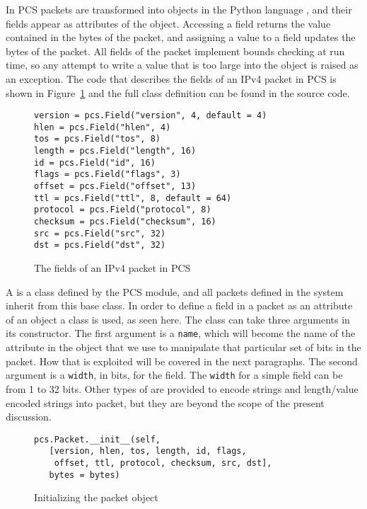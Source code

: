 \documentclass{sig-alternate-10pt}
\begin{document}
In PCS packets are transformed into objects in the Python language
\cite{vanRossum}, and their fields appear as attributes of the object.
Accessing a field returns the value contained in the bytes of the
packet, and assigning a value to a field updates the bytes of the
packet.  All fields of the packet implement bounds checking at run
time, so any attempt to write a value that is too large into the
object is raised as an exception.  The code that describes the fields
of an IPv4 packet in PCS is shown in
Figure~\ref{fig:ipv4-packet-in-pcs} and the full class definition can
be found in the source code\cite{}.

\begin{figure}
  \centering
\begin{verbatim}
version = pcs.Field("version", 4, default = 4)
hlen = pcs.Field("hlen", 4)
tos = pcs.Field("tos", 8)
length = pcs.Field("length", 16)
id = pcs.Field("id", 16)
flags = pcs.Field("flags", 3)
offset = pcs.Field("offset", 13)
ttl = pcs.Field("ttl", 8, default = 64)
protocol = pcs.Field("protocol", 8)
checksum = pcs.Field("checksum", 16)
src = pcs.Field("src", 32)
dst = pcs.Field("dst", 32)
\end{verbatim}
  \caption{The fields of an IPv4 packet in PCS}
  \label{fig:ipv4-packet-in-pcs}
\end{figure}

A  is a class defined by the PCS module, and all packets
defined in the system inherit from this base class.  In order to
define a field in a packet as an attribute of an object a
 class is used, as seen here.  The  class
can take three arguments in its constructor.  The first argument is a
\verb|name|, which will become the name of the attribute in the object
that we use to manipulate that particular set of bits in the packet.
How that is exploited will be covered in the next paragraphs.  The
second argument is a \verb|width|, in bits, for the field.  The
\verb|width| for a simple field can be from 1 to 32 bits.  Other
types of  are provided to encode strings and
length/value encoded strings into packet, but they are beyond the
scope of the present discussion.

\begin{figure}
  \centering
\begin{verbatim}
pcs.Packet.__init__(self,
   [version, hlen, tos, length, id, flags, 
    offset, ttl, protocol, checksum, src, dst],
   bytes = bytes)
\end{verbatim}
  \caption{Initializing the packet object}
  \label{fig:initializing-the-packet-object}
\end{figure}
\end{document}

